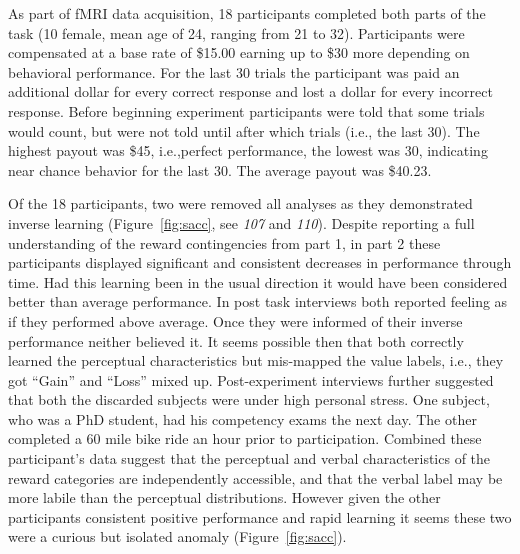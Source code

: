 As part of fMRI data acquisition, 18 participants completed both parts of the task (10 female, mean age of 24, ranging from 21 to 32). Participants were compensated at a base rate of \$15.00 earning up to \$30 more depending on behavioral performance. For the last 30 trials the participant was paid an additional dollar for every correct response and lost a dollar for every incorrect response.  Before beginning experiment participants were told that some trials would count, but were not told until after which trials (i.e., the last 30).  The highest payout was \$45, i.e.,perfect performance, the lowest was 30, indicating near chance behavior for the last 30.  The average payout was \$40.23.

Of the 18 participants, two were removed all analyses as they demonstrated inverse learning (Figure~\ref{fig:sacc}, see \emph{107} and \emph{110}).  Despite reporting a full understanding of the reward contingencies from part 1, in part 2 these participants displayed significant and consistent decreases in performance through time.  Had this learning been in the usual direction it would have been considered better than average performance.  In post task interviews both reported feeling as if they performed above average.  Once they were informed of their inverse performance neither believed it.  It seems possible then that both correctly learned the perceptual characteristics but mis-mapped the value labels, i.e., they got ``Gain'' and ``Loss''  mixed up.  Post-experiment interviews further suggested that both the discarded subjects were under high personal stress.  One subject, who was a PhD student, had his competency exams the next day.  The other completed a 60 mile bike ride an hour prior to participation.  Combined these participant's data suggest that the perceptual and verbal characteristics of the reward categories are independently accessible, and that the verbal label may be more labile than the perceptual distributions.  However given the other participants consistent positive performance and rapid learning it seems these two were a curious but isolated anomaly (Figure~\ref{fig:sacc}).

